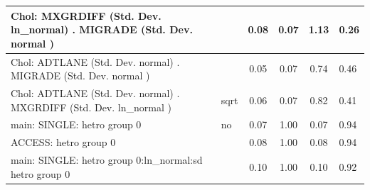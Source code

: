 \begin{table}
\begin{center}
\begin{tabular}{|l|l|c|c|c|l|}
			\hline
			 Chol: MXGRDIFF (Std. Dev. ln_normal) . MIGRADE (Std. Dev.   normal ) &  & 0.08 & 0.07 & 1.13 & 0.26 \\
			\hline
			 Chol: ADTLANE (Std. Dev. normal) . MIGRADE (Std. Dev.   normal ) &  & 0.05 & 0.07 & 0.74 & 0.46 \\
			\hline
			 Chol: ADTLANE (Std. Dev. normal) . MXGRDIFF (Std. Dev.   ln_normal ) & sqrt & 0.06 & 0.07 & 0.82 & 0.41 \\
			\hline
			main: SINGLE: hetro group 0 & no & 0.07 & 1.00 & 0.07 & 0.94 \\
			\hline
			ACCESS: hetro group 0 &  & 0.08 & 1.00 & 0.08 & 0.94 \\
			\hline
			main: SINGLE: hetro group 0:ln_normal:sd  hetro group 0 &  & 0.10 & 1.00 & 0.10 & 0.92 \\
			\hline
		\end{tabular}
	\end{center}
\end{table}